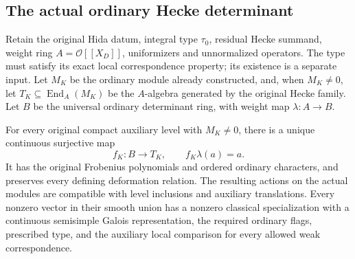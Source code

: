 \subsection{The actual ordinary Hecke determinant}
\label{sec:selmer-hecke-determinant}

Retain the original Hida datum, integral type \(\tau_0\), residual
Hecke summand, weight ring \(A=\mathcal O[[X_D]]\), uniformizers and
unnormalized operators.  The type must satisfy its exact local
correspondence property; its existence is a separate input.  Let
\(M_K\) be the ordinary module already constructed, and, when
\(M_K\ne0\), let \(T_K\subseteq\operatorname{End}_A(M_K)\) be the
\(A\)-algebra generated by the original Hecke family.  Let \(B\)
be the universal ordinary determinant ring, with weight map
\(\lambda:A\to B\).

\begin{proposition}
\label{prop:selmer-hecke-determinant}
For every original compact auxiliary level with \(M_K\ne0\), there
is a unique continuous surjective map
\[
                 f_K:B\longrightarrow T_K,\qquad f_K\lambda(a)=a.
\]
It has the original Frobenius polynomials and ordered ordinary
characters, and preserves every defining deformation relation.
The resulting actions on the actual modules are compatible with
level inclusions and auxiliary translations.  Every nonzero vector
in their smooth union has a nonzero classical specialization with
a continuous semisimple Galois representation, the required
ordinary flags, prescribed type, and the auxiliary local comparison
for every allowed weak correspondence.
\end{proposition}

